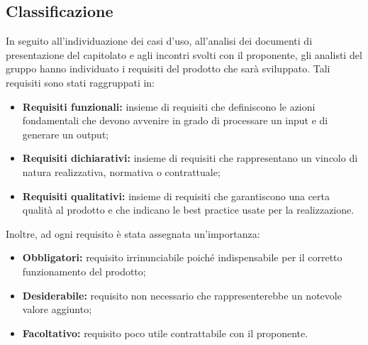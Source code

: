 \subsection{Classificazione}
In seguito all'individuazione dei casi d'uso, all'analisi dei documenti di presentazione del capitolato e agli incontri svolti con il proponente, gli analisti del gruppo \Gruppo{} hanno individuato i requisiti del prodotto che sar\`{a} sviluppato. Tali requisiti sono stati raggruppati in:

\begin{itemize}
    \item \textbf{Requisiti funzionali:} insieme di requisiti che definiscono le azioni fondamentali che devono avvenire in grado di processare un input e di generare un output;
    \item  \textbf{Requisiti dichiarativi:} insieme di requisiti che rappresentano un vincolo di natura realizzativa, normativa o contrattuale;
    \item \textbf{Requisiti qualitativi:} insieme di requisiti che garantiscono una certa qualit\`{a} al prodotto e che indicano le best practice usate per la realizzazione.
\end{itemize}

Inoltre, ad ogni requisito \`{e} stata assegnata un'importanza:

\begin{itemize}
    \item \textbf{Obbligatori:} requisito irrinunciabile poich\'{e} indispensabile per il corretto funzionamento del prodotto;
    \item \textbf{Desiderabile:} requisito non necessario che rappresenterebbe un notevole valore aggiunto;
    \item \textbf{Facoltativo:} requisito poco utile contrattabile con il proponente.
\end{itemize}



